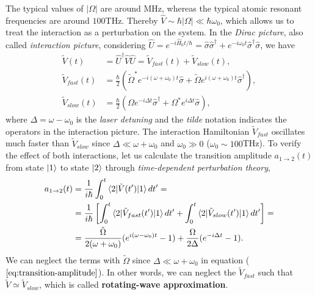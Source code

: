 The typical values of $ |\Omega| $ are around MHz, whereas the typical atomic resonant frequencies are around $100$THz. Thereby $ \hat{V} \sim \hbar |\Omega| \ll \hbar \omega_0 $, which allows us to treat the interaction as a perturbation on the system. In the \textit{Dirac picture}, also called \textit{interaction picture}, considering $ \hat{U} = e^{-i \hat{H}_0 t / \hbar} = \hat{\sigma}\hat{\sigma}^{\dagger} + e^{-i\omega_0 t} \hat{\sigma}^{\dagger}\hat{\sigma}$, we have
\begin{align}
	\tilde{V}(t) &= \hat{U}^{\dagger} \hat{V} \hat{U} = \tilde{V}_{fast}(t) + \tilde{V}_{slow}(t), \\
	\tilde{V}_{fast}(t) &= \frac{\hbar}{2}(\tilde{\Omega}^* e^{-i(\omega + \omega_0)t} \hat{\sigma} + \tilde{\Omega}e^{i(\omega + \omega_0)t} \hat{\sigma}^{\dagger}), \\
	\tilde{V}_{slow}(t) &= \frac{\hbar}{2}(\Omega e^{-i \Delta t} \hat{\sigma}^{\dagger} + \Omega^{*}e^{i \Delta t} \hat{\sigma}),
	\label{eq:interaction-Hamiltonian-Dirac-picture}
\end{align}
where $ \Delta = \omega - \omega_0 $ is the \textit{laser detuning} and the \textit{tilde} notation indicates the operators in the interaction picture. The interaction Hamiltonian $ \tilde{V}_{fast} $ oscillates much faster than $ \tilde{V}_{slow} $ since $ \Delta \ll \omega + \omega_0 $ and $ \omega_0 \gg 0 $ ($ \omega_0 \sim 100$THz). To verify the effect of both interactions, let us calculate the transition amplitude $a_{1 \rightarrow 2}(t) $ from state $ \ket{1} $ to state $ \ket{2} $ through \textit{time-dependent perturbation theory},
\begin{align}
	a_{1 \rightarrow 2}(t) &= \frac{1}{i\hbar} \int_{0}^{t} \braket{2|\tilde{V}(t')|1} dt' =\\
	&= \frac{1}{i\hbar} \left[ \int_{0}^{t} \braket{2|\tilde{V}_{fast}(t')|1} dt' + \int_{0}^{t} \braket{2|\tilde{V}_{slow}(t')|1} dt' \right] =\\
	&= \frac{\tilde{\Omega}}{2(\omega + \omega_0)}(e^{i(\omega - \omega_0)t} - 1) + \frac{\Omega}{2\Delta}(e^{-i\Delta t} - 1).
	\label{eq:transition-amplitude}
\end{align}
We can neglect the terms with $ \tilde{\Omega} $ since $ \Delta \ll \omega + \omega_0 $ in equation ($ \ref{eq:transition-amplitude} $). In other words, we can neglect the $ \tilde{V}_{fast} $ such that $ \tilde{V} \simeq \tilde{V}_{slow} $, which is called \textbf{rotating-wave approximation}.

